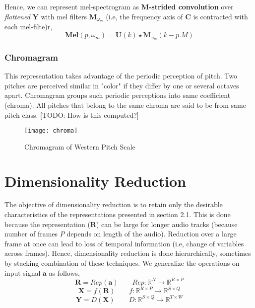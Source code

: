 \noindent Hence, we can represent mel-spectrogram as \textbf{M-strided convolution} over \textit{flattened} $\textbf{Y}$ with mel filters $\textbf{M}_{\omega_{m}}$ (i.e, the frequency axis of $\textbf{C}$ is contracted with each mel-filte)r, 
\begin{equation}
\boxed
{
  \textbf{Mel}(p, \omega_{m} ) = \textbf{U}(k) \star \textbf{M}_{\omega_{m}}(k - p.M)
}
\end{equation}
  
\subsubsection{Chromagram}

This representation takes advantage of the periodic perception of pitch. Two pitches are perceived similar in "color" if they differ by one or several octaves apart. Chromagram groups such periodic perceptions into same coefficient (chroma). All pitches that belong to the same chroma are said to be from same pitch class. [TODO: How is this computed?]
\begin{figure}[h] 
\centering
\texttt{[image: chroma]}
\caption{Chromagram of Western Pitch Scale}
 \label{fig:Chromagram}
 \end{figure}
\FloatBarrier
\bigskip

\section{Dimensionality Reduction}
The objective of dimensionality reduction is to retain only the desirable characteristics of the representations presented in section 2.1. This is done because the representation ($\textbf{R}$) can be large for longer audio tracks (because number of frames $P$ depends on length of the audio). Reduction over a large frame at once can lead to loss of temporal information (i.e, change of variables across frames). Hence, dimensionality reduction is done hierarchically, sometimes by stacking combination of these techniques. We generalize the operations on input signal $\textbf{a}$ as follows,
\[
   \textbf{R} = Rep(\textbf{a}) \qquad Rep : \mathbb{R}^{N} \rightarrow \mathbb{R}^{R \times P}
\]
\[
   \textbf{X} = f(\textbf{R}) \qquad f : \mathbb{R}^{R \times P} \rightarrow \mathbb{R}^{S \times Q} 
\]
\[
   \textbf{Y} = D(\textbf{X}) \qquad D : \mathbb{R}^{S \times Q} \rightarrow \mathbb{R}^{T \times W} 
\] 

